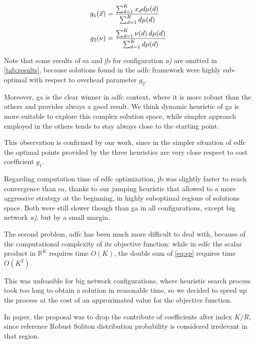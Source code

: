 \documentclass[12pt,journal,draftclsnofoot,onecolumn]{IEEEtran}
\begin{document}
\begin{equation*}
	\openup 1\jot %
	\begin{split}
		g_1(\vec{x}) &= \frac{\sum_{d=1}^K x_d d \mu (d)}{\sum_{d=1}^K d \mu (d)} \\
		g_2(\nu) &= \frac{\sum_{d=1}^K \nu(d) \, d \mu (d)}{\sum_{d=1}^K d \mu (d)}
	\end{split}
\end{equation*} \vspace{0cm}

Note that some results of \gls{sa} and \gls{jb} for configuration \emph{a)} are omitted in \autoref{tab:results}, because solutions found in the \gls{adfc} framework were highly sub-optimal with respect to overhead parameter $g_2$.

Moreover, \gls{ga} is the clear  winner in \gls{adfc} context, where it is more robust than the others and provides always a good result.
We think dynamic heuristic of \gls{ga} is more suitable to explore this complex solution space, while simpler approach employed in the others tends to stay always close to the starting point.

This observation is confirmed by our work, since in the simpler situation of \gls{edfc} the optimal points provided by the three heuristics are very close respect to cost coefficient $g_1$.

\smallbreak
Regarding computation time of \gls{edfc} optimization, \gls{jb} was slightly faster to reach convergence than \gls{sa}, thanks to our jumping heuristic that allowed to a more aggressive strategy at the beginning, in highly suboptimal regions of solutions space.
Both were still slower though than \gls{ga} in all configurations, except big network \emph{a)}, but by a small margin.

The second problem, \gls{adfc} has been much more difficult to deal with, because of the computational complexity of its objective function: while in \gls{edfc} the scalar product in $\mathbb{R}^K$ requires time $O(K)$, the double sum of \autoref{eq:sp} requires time $O(K^2)$.

This was unfeasible for big network configurations, where heuristic search process took too long to obtain a solution in reasonable time, so we decided to speed up the process at the cost of an approximated value for the objective function.

In paper\cite{Lin2007}, the proposal was to drop the contribute of coefficients after index $K/R$, since reference Robust Soliton distribution probability is considered irrelevant in that region.
\end{document}
